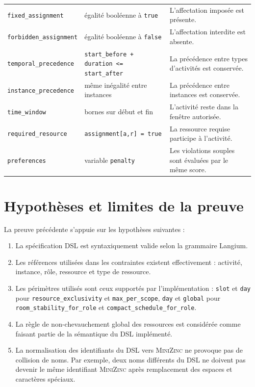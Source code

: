 \documentclass[12pt,a4paper]{article}
\newcommand{\MZN}{\textsc{MiniZinc}}
\newcommand{\codecell}[1]{\texttt{\footnotesize #1}}
\begin{document}
\begin{longtable}{@{}L{0.28\textwidth}L{0.34\textwidth}L{0.30\textwidth}@{}}
\codecell{fixed\_\allowbreak assignment} &
égalité booléenne à \codecell{true} &
L'affectation imposée est présente. \\

\codecell{forbidden\_\allowbreak assignment} &
égalité booléenne à \codecell{false} &
L'affectation interdite est absente. \\

\codecell{temporal\_\allowbreak precedence} &
\codecell{start\_before + duration <= start\_after} &
La précédence entre types d'activités est conservée. \\

\codecell{instance\_\allowbreak precedence} &
même inégalité entre instances &
La précédence entre instances est conservée. \\

\codecell{time\_\allowbreak window} &
bornes sur début et fin &
L'activité reste dans la fenêtre autorisée. \\

\codecell{required\_\allowbreak resource} &
\codecell{assignment[a,r] = true} &
La ressource requise participe à l'activité. \\

\codecell{preferences} &
variable \codecell{penalty} &
Les violations souples sont évaluées par le même score. \\
\end{longtable}
\endgroup

\section{Hypothèses et limites de la preuve}

La preuve précédente s'appuie sur les hypothèses suivantes :

\begin{enumerate}[leftmargin=1.2cm]
  \item La spécification DSL est syntaxiquement valide selon la grammaire Langium.
  \item Les références utilisées dans les contraintes existent effectivement : activité, instance, rôle, ressource et type de ressource.
  \item Les périmètres utilisés sont ceux supportés par l'implémentation : \texttt{slot} et \texttt{day} pour \texttt{resource\_exclusivity} et \texttt{max\_per\_scope}, \texttt{day} et \texttt{global} pour \texttt{room\_stability\_for\_role} et \texttt{compact\_schedule\_for\_role}.
  \item La règle de non-chevauchement global des ressources est considérée comme faisant partie de la sémantique du DSL implémenté.
  \item La normalisation des identifiants du DSL vers \MZN{} ne provoque pas de collision de noms. Par exemple, deux noms différents du DSL ne doivent pas devenir le même identifiant \MZN{} après remplacement des espaces et caractères spéciaux.
\end{enumerate}
\end{document}
